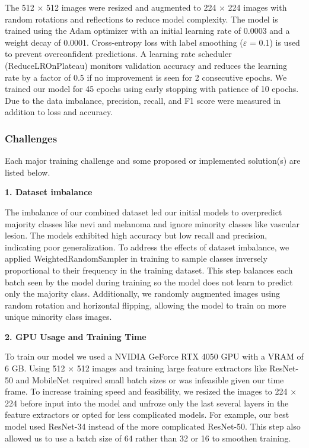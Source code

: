 \documentclass{article} %
\begin{document}
The 512 × 512 images were resized and augmented to 224 × 224 images with random rotations and reflections to reduce model complexity. The model is trained using the Adam optimizer with an initial learning rate of 0.0003 and a weight decay of 0.0001. Cross-entropy loss with label smoothing ($\varepsilon$ = 0.1) is used to prevent overconfident predictions. A learning rate scheduler (ReduceLROnPlateau) monitors validation accuracy and reduces the learning rate by a factor of 0.5 if no improvement is seen for 2 consecutive epochs. We trained our model for 45 epochs using early stopping with patience of 10 epochs. Due to the data imbalance, precision, recall, and F1 score were measured in addition to loss and accuracy.



\subsubsection{Challenges}

Each major training challenge and some proposed or implemented solution(s) are listed below.

\textbf{1. Dataset imbalance}

The imbalance of our combined dataset led our initial models to overpredict majority classes like nevi and melanoma and ignore minority classes like vascular lesion. The models exhibited high accuracy but low recall and precision, indicating poor generalization. To address the effects of dataset imbalance, we applied WeightedRandomSampler in training to sample classes inversely proportional to their frequency in the training dataset. This step balances each batch seen by the model during training so the model does not learn to predict only the majority class. Additionally, we randomly augmented images using random rotation and horizontal flipping, allowing the model to train on more unique minority class images.

\textbf{2. GPU Usage and Training Time}

To train our model we used a NVIDIA GeForce RTX 4050 GPU with a VRAM of 6 GB. Using 512 × 512 images and training large feature extractors like ResNet-50 and MobileNet required small batch sizes or was infeasible given our time frame. To increase training speed and feasibility, we resized the images to 224 × 224 before input into the model and unfroze only the last several layers in the feature extractors or opted for less complicated models. For example, our best model used ResNet-34 instead of the more complicated ResNet-50. This step also allowed us to use a batch size of 64 rather than 32 or 16 to smoothen training.
\end{document}

